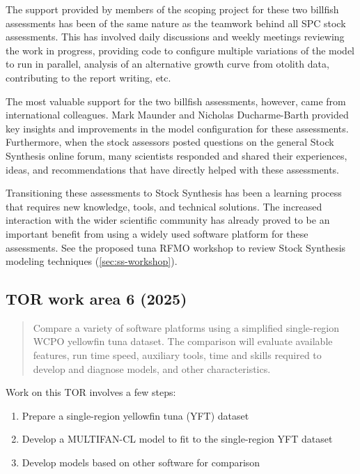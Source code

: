 \documentclass{SCreport}
\begin{document}
The support provided by members of the scoping project for these two billfish
assessments has been of the same nature as the teamwork behind all SPC stock
assessments. This has involved daily discussions and weekly meetings reviewing
the work in progress, providing code to configure multiple variations of the
model to run in parallel, analysis of an alternative growth curve from otolith
data, contributing to the report writing, etc.

The most valuable support for the two billfish assessments, however, came from
international colleagues. Mark Maunder and Nicholas Ducharme-Barth provided key
insights and improvements in the model configuration for these assessments.
Furthermore, when the stock assessors posted questions on the general Stock
Synthesis online forum, many scientists responded and shared their experiences,
ideas, and recommendations that have directly helped with these assessments.

Transitioning these assessments to Stock Synthesis has been a learning process
that requires new knowledge, tools, and technical solutions. The increased
interaction with the wider scientific community has already proved to be an
important benefit from using a widely used software platform for these
assessments. See the proposed tuna RFMO workshop to review Stock Synthesis
modeling techniques (\autoref{sec:ss-workshop}).

\vspace{2ex}

\subsection{TOR work area 6 (2025)}

\begin{quote}\sf
  Compare a variety of software platforms using a simplified single-region WCPO
  yellowfin tuna dataset. The comparison will evaluate available features, run
  time speed, auxiliary tools, time and skills required to develop and diagnose
  models, and other characteristics.
\end{quote}

\vspace{2ex}

Work on this TOR involves a few steps:

\begin{enumerate}
  \item Prepare a single-region yellowfin tuna (YFT) dataset\\[-4ex]
  \item Develop a MULTIFAN-CL model to fit to the single-region YFT
  dataset\\[-4ex]
  \item Develop models based on other software for comparison
\end{enumerate}
\end{document}

